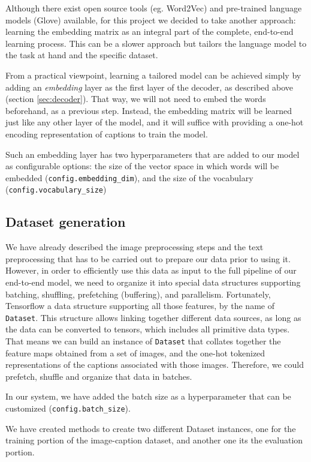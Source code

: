 Although there exist open source tools (eg. Word2Vec) and pre-trained language models (Glove) available, for this project we decided to take another approach: learning the embedding matrix as an integral part of the complete, end-to-end learning process. This can be a slower approach but tailors the language model to the task at hand and the specific dataset. 

From a practical viewpoint, learning a tailored model can be achieved simply by adding an \textit{embedding} layer as the first layer of the decoder, as described above (section \cref{sec:decoder}). That way, we will not need to embed the words beforehand, as a previous step. Instead, the embedding matrix will be learned just like any other layer of the model, and it will suffice with providing a one-hot encoding representation of captions to train the model.

Such an embedding layer has two hyperparameters that are added to our model as configurable options: the size of the vector space in which words will be embedded (\lstinline{config.embedding_dim}), and the size of the vocabulary (\lstinline{config.vocabulary_size})

\subsection{Dataset generation}

We have already described the image preprocessing steps and the text preprocessing that has to be carried out to prepare our data prior to using it. However, in order to efficiently use this data as input to the full pipeline of our end-to-end model, we need to organize it into special data structures supporting batching, shuffling, prefetching (buffering), and parallelism. Fortunately, Tensorflow a data structure supporting all those features, by the name of \lstinline{Dataset}. This structure allows linking together different data sources, as long as the data can be converted to tensors, which includes all primitive data types. That means we can build an instance of \lstinline{Dataset} that collates together the feature maps obtained from a set of images, and the one-hot tokenized representations of the captions associated with those images. Therefore, we could prefetch, shuffle and organize that data in batches.

In our system, we have added the batch size as a hyperparameter that can be customized (\lstinline{config.batch_size}). 

We have created methods to create two different Dataset instances, one for the training portion of the image-caption dataset, and another one its the evaluation portion.


